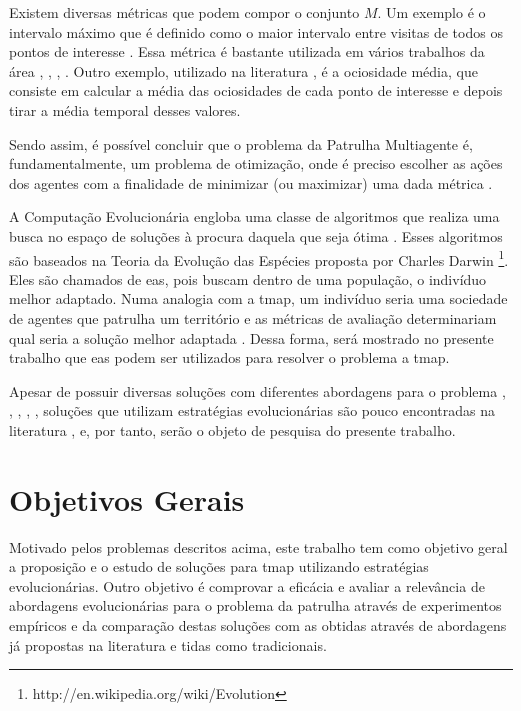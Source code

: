 Existem diversas métricas que podem compor o conjunto $M$. Um exemplo é o 
intervalo máximo que é definido como o maior intervalo entre visitas de todos os 
pontos de interesse \citep{sampaiophd}. Essa métrica é bastante utilizada em 
vários trabalhos da área \citep{6900280}, \cite{Pippin:2013:PBT:2480362.2480378}, 
\citep{Chevaleyre:2004:TAM:1018411.1019013}, \citep{6615158}. Outro exemplo, 
utilizado na literatura \citep{hernandez2013game}, é a ociosidade média, que 
consiste em calcular a média das ociosidades de cada ponto de interesse e depois 
tirar a média temporal desses valores.

Sendo assim, é possível concluir que o problema da Patrulha Multiagente é, 
fundamentalmente, um problema de otimização, onde é preciso escolher as ações 
dos agentes com a finalidade de minimizar (ou maximizar) uma dada métrica 
\citep{sampaiophd}.

A Computação Evolucionária engloba uma classe de algoritmos que realiza uma 
busca no espaço de soluções à procura daquela que seja ótima 
\citep{Luke2013Metaheuristics}. Esses algoritmos são baseados na Teoria da 
Evolução das Espécies proposta por Charles Darwin 
\footnote{http://en.wikipedia.org/wiki/Evolution}. Eles são chamados de \acp{ea}, 
pois buscam dentro de uma população, o indivíduo melhor adaptado. Numa analogia 
com a \ac{tmap}, um indivíduo seria uma sociedade de agentes que patrulha um 
território e as métricas de avaliação determinariam qual seria a solução melhor 
adaptada . Dessa forma, será mostrado no presente trabalho que \acp{ea} podem 
ser utilizados para resolver o problema a \ac{tmap}.

Apesar de possuir diversas soluções com diferentes abordagens para o problema 
\citep{Chevaleyre:2004:TAM:1018411.1019013}, 
\citep{Machado:2002:MPE:1765317.1765332}, \citep{Almeida:2004:AAI}, 
\citep{4209122}, \citep{hernandez2013game}, soluções que utilizam estratégias 
evolucionárias \citep{Luke2013Metaheuristics} são pouco encontradas na 
literatura \citep{4630897}, \citep{6900280} e, por tanto, serão o objeto de 
pesquisa do presente trabalho.

\section{Objetivos Gerais}

Motivado pelos problemas descritos acima, este trabalho tem como objetivo geral 
a proposição e o estudo de soluções para \ac{tmap} utilizando estratégias 
evolucionárias. Outro objetivo é comprovar a eficácia e avaliar a relevância de 
abordagens evolucionárias para o problema da patrulha através de experimentos 
empíricos e da comparação destas soluções com as obtidas através de abordagens 
já propostas na literatura e tidas como tradicionais.

